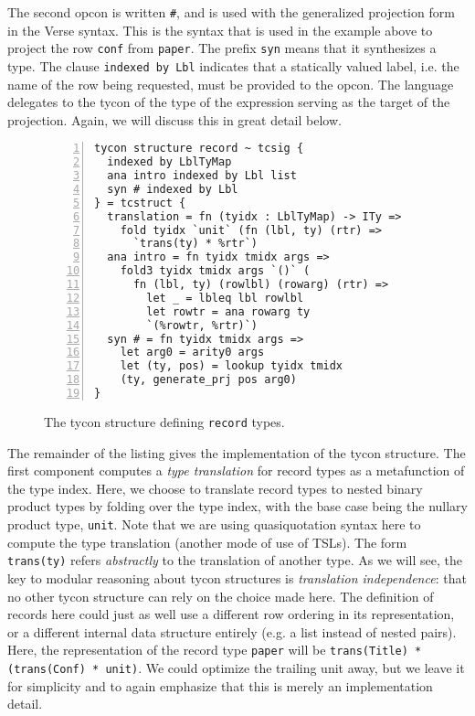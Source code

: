\documentclass[preprint]{sigplanconf}
\newcommand{\Verse}{{\textsf{\small Verse}}}
\newcommand{\liv}[1]{\lstinline{#1}}
\begin{document}
The second opcon is written \liv{#}, and is used with the generalized projection form in the {\Verse} syntax. This is the syntax that is used in the example above to project the row \liv{conf} from \liv{paper}. The prefix \liv{syn} means that it synthesizes a type. The clause \liv{indexed by Lbl} indicates that a statically valued label, i.e. the name of the row being requested, must be provided to the opcon. The language delegates to the tycon of the type of the expression serving as the target of the projection. Again, we will discuss this in great detail below.



\begin{figure}[t]\vspace{-5px}
\begin{lstlisting}[numbers=left]
tycon structure record ~ tcsig {
  indexed by LblTyMap
  ana intro indexed by Lbl list
  syn # indexed by Lbl
} = tcstruct {
  translation = fn (tyidx : LblTyMap) -> ITy => 
    fold tyidx `unit` (fn (lbl, ty) (rtr) => 
      `trans(ty) * %rtr`)
  ana intro = fn tyidx tmidx args => 
    fold3 tyidx tmidx args `()` (
      fn (lbl, ty) (rowlbl) (rowarg) (rtr) =>
        let _ = lbleq lbl rowlbl
        let rowtr = ana rowarg ty
        `(%rowtr, %rtr)`)    
  syn # = fn tyidx tmidx args => 
    let arg0 = arity0 args
    let (ty, pos) = lookup tyidx tmidx
    (ty, generate_prj pos arg0)
}
\end{lstlisting}
\caption{The tycon structure defining \liv{record} types.}
\label{fig:record-conc}\vspace{-12px}
\end{figure}

The remainder of the listing gives the implementation of the tycon structure. The first component computes a \emph{type translation} for record types as a metafunction of the type index. Here, we choose to translate record types to nested binary product types by folding over the type index, with the base case being the nullary product type, \liv{unit}. Note that we are using quasiquotation syntax here to compute the type translation (another mode of use of TSLs). The form \liv{trans(ty)} refers \emph{abstractly} to the translation of another type. As we will see, the key to modular reasoning about tycon structures is \emph{translation independence}: that no other tycon structure can rely on the choice made here. The definition of records here could just as well use a different row ordering in its representation, or a different internal data structure entirely (e.g. a list instead of nested pairs). Here, the representation of the record type \liv{paper} will be \liv{trans(Title) * (trans(Conf) * unit)}. We could optimize the trailing unit away, but we leave it for simplicity and to again emphasize that this is merely an implementation detail.
\end{document}
